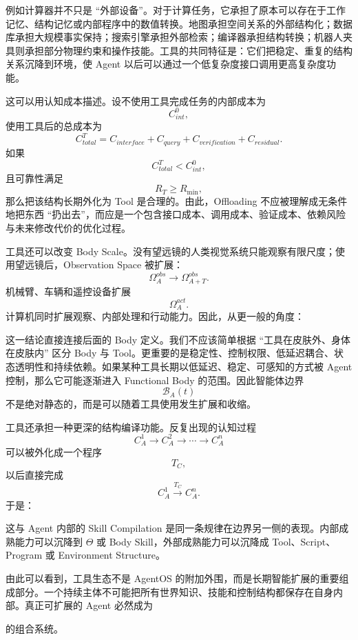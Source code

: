例如计算器并不只是 ``外部设备''。对于计算任务，它承担了原本可以存在于工作记忆、结构记忆或内部程序中的数值转换。地图承担空间关系的外部结构化；数据库承担大规模事实保持；搜索引擎承担外部检索；编译器承担结构转换；机器人夹具则承担部分物理约束和操作技能。工具的共同特征是：它们把稳定、重复的结构关系沉降到环境，使 Agent 以后可以通过一个低复杂度接口调用更高复杂度功能。

这可以用认知成本描述。设不使用工具完成任务的内部成本为
\[
C_{int}^{0},
\]
使用工具后的总成本为
\[
C_{total}^{T}
=
C_{interface}
+
C_{query}
+
C_{verification}
+
C_{residual}.
\]
如果
\[
C_{total}^{T}
<
C_{int}^{0},
\]
且可靠性满足
\[
R_T
\geq
R_{\min},
\]
那么把该结构长期外化为 Tool 是合理的。由此，Offloading 不应被理解成无条件地把东西 ``扔出去''，而应是一个包含接口成本、调用成本、验证成本、依赖风险与未来修改代价的优化过程。

工具还可以改变 Body Scale。没有望远镜的人类视觉系统只能观察有限尺度；使用望远镜后，Observation Space 被扩展：
\[
\Omega_A^{obs}
\rightarrow
\Omega_{A+T}^{obs}.
\]
机械臂、车辆和遥控设备扩展
\[
\Omega_A^{act}.
\]
计算机同时扩展观察、内部处理和行动能力。因此，从更一般的角度：
\begin{statementbox}
\centering
{}
\end{statementbox}

这一结论直接连接后面的 Body 定义。我们不应该简单根据 ``工具在皮肤外、身体在皮肤内'' 区分 Body 与 Tool。更重要的是稳定性、控制权限、低延迟耦合、状态透明性和持续依赖。如果某种工具长期以低延迟、稳定、可感知的方式被 Agent 控制，那么它可能逐渐进入 Functional Body 的范围。因此智能体边界
\[
\mathcal B_A(t)
\]
不是绝对静态的，而是可以随着工具使用发生扩展和收缩。

工具还承担一种更深的结构编译功能。反复出现的认知过程
\[
C_A^1\rightarrow C_A^2\rightarrow\cdots\rightarrow C_A^n
\]
可以被外化成一个程序
\[
T_C,
\]
以后直接完成
\[
C_A^1
\xrightarrow{T_C}
C_A^n.
\]
于是：
\begin{statementbox}
\centering
{}
\end{statementbox}
这与 Agent 内部的 Skill Compilation 是同一条规律在边界另一侧的表现。内部成熟能力可以沉降到 $\Theta$ 或 Body Skill，外部成熟能力可以沉降成 Tool、Script、Program 或 Environment Structure。

由此可以看到，工具生态不是 AgentOS 的附加外围，而是长期智能扩展的重要组成部分。一个持续主体不可能把所有世界知识、技能和控制结构都保存在自身内部。真正可扩展的 Agent 必然成为
\begin{statementbox}
\centering
{}
\end{statementbox}
的组合系统。

